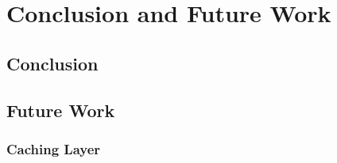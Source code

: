 \chapter{Conclusion and Future Work}
\minitoc

\section{Conclusion}

\section{Future Work}

\subsection{Caching Layer}
